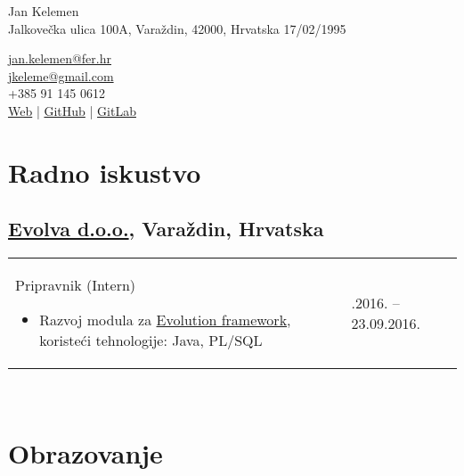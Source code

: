 \documentclass[a4paper]{article}
\makeatletter
\newlength{\tablewidth}
\newenvironment{period}[2]{%
\newcommand{\sarma}{#2}%
\setlength{\tablewidth}{\linewidth}
\addtolength{\tablewidth}{-2\tabcolsep}
\begin{tabular}{@{}p{0.75\tablewidth}>{\raggedleft\arraybackslash}p{0.25\tablewidth}@{}}%
#1 \newline
\begin{itemize}
}{%
\end{itemize} & \sarma \\%
\end{tabular}\\
}
\makeatother
\begin{document}
\fontfamily{\sfdefault}
\selectfont

\begin{minipage}{.5\textwidth}
\LARGE{Jan Kelemen}\\
\normalsize{Jalkove\v{c}ka ulica 100A, Vara\v{z}din, 42000, Hrvatska}
\normalsize{17/02/1995}
\end{minipage}%
\begin{minipage}{.5\textwidth}
\raggedleft
\href{mailto:jan.kelemen@fer.hr}{jan.kelemen@fer.hr} \\
\href{mailto:jkeleme@gmail.com}{jkeleme@gmail.com} \\
+385 91 145 0612 \\
\href{http://jan-kelemen.github.io/}{Web} | \href{https://github.com/jan-kelemen}{GitHub} | \href{https://gitlab.com/jan-kelemen}{GitLab}
\end{minipage}

\vspace{1em}

\section{Radno iskustvo}
\subsection{\href{http://www.evolva.hr/hr/index.html}{Evolva d.o.o.}, Vara\v{z}din, Hrvatska}
\begin{period}{Pripravnik (Intern)}{22.08.2016. -- 23.09.2016.}
	\item
		Razvoj modula za \href{http://www.evolution-framework.com/}{Evolution framework}, koriste\'{c}i tehnologije: Java, PL/SQL
\end{period}

\section{Obrazovanje}
\end{document}
